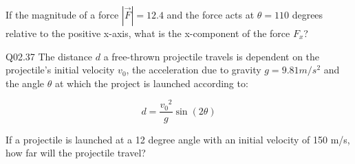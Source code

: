 \documentclass{book}
\newenvironment{problems}{}{}  %
\begin{document}
\begin{problems}
If the magnitude of a force \(|\vec{F}| = 12.4\) and the force acts at
\(\theta=110\) degrees relative to the positive x-axis, what is the
x-component of the force \(F_x\)?

Q02.37 The distance \(d\) a free-thrown projectile travels is dependent
on the projectile's initial velocity \(v_0\), the acceleration due to
gravity \(g=9.81 m/s^2\) and the angle \(\theta\) at which the project
is launched according to:

\[ d = \frac{{v_0}^2}{g} \sin(2\theta) \]

If a projectile is launched at a 12 degree angle with an initial
velocity of 150 m/s, how far will the projectile travel?
        \end{problems}

    
\end{document}
